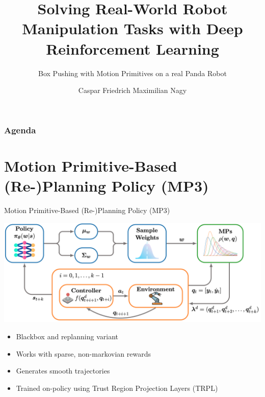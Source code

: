 \documentclass[16:9,en,navbarinfooter]{sdqbeamer}
\author{Caspar Friedrich Maximilian Nagy}
\title{Solving Real-World Robot Manipulation Tasks with Deep Reinforcement Learning}
\subtitle{Box Pushing with Motion Primitives on a real Panda Robot}
\begin{document}
\KITtitleframe{}

% 

\begin{frame}
	\frametitle{Agenda}
	\vspace{1cm}
	\setcounter{tocdepth}{1}
	\tableofcontents
\end{frame}

\section{Motion Primitive-Based (Re-)Planning Policy (MP3)}
\begin{frame}{Motion Primitive-Based (Re-)Planning Policy (MP3)}

	\center
	\vspace{1cm}
	\includegraphics[width=.7\linewidth]{media/mp3.png}
	\begin{itemize}
		\item Blackbox and replanning variant
		\item Works with sparse, non-markovian rewards
		\item Generates smooth trajectories
		\item Trained on-policy using Trust Region Projection Layers (TRPL)
	\end{itemize}
\end{frame}
\end{document}
